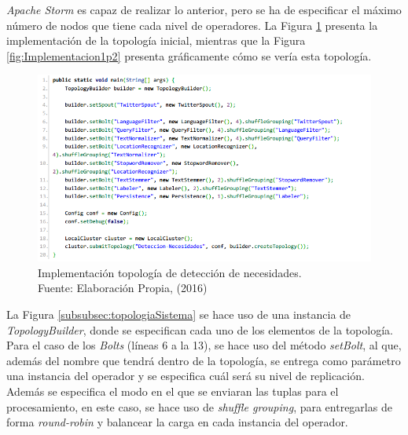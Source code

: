\textit{Apache Storm} es capaz de realizar lo anterior, pero se ha de especificar el máximo número de nodos que tiene cada nivel de operadores. La Figura \ref{fig:Implementacion1} presenta la implementación de la topología inicial, mientras que la Figura \ref{fig:Implementacion1p2} presenta gráficamente cómo se vería esta topología.

\begin{figure}[H]
	\centering
	\captionsetup{justification=centering}
	\includegraphics[scale=0.8]{images/ImplementacionTopologia1.png}
	\caption[Implementación topología de detección de necesidades.]{Implementación topología de detección de necesidades.\\Fuente: Elaboración Propia, (2016)}
	\label{fig:Implementacion1}
\end{figure}


La Figura \ref{subsubsec:topologiaSistema} se hace uso de una instancia de \textit{TopologyBuilder}, donde se especifican cada uno de los elementos de la topología. Para el caso de los \textit{Bolts} (líneas 6 a la 13), se hace uso del método \textit{setBolt}, al que, además del nombre que tendrá dentro de la topología, se entrega como parámetro una instancia del operador y se especifica cuál será su nivel de replicación. Además se especifica el modo en el que se enviaran las tuplas para el procesamiento, en este caso, se hace uso de \textit{shuffle grouping}, para entregarlas de forma \textit{round-robin} y balancear la carga en cada instancia del operador.


